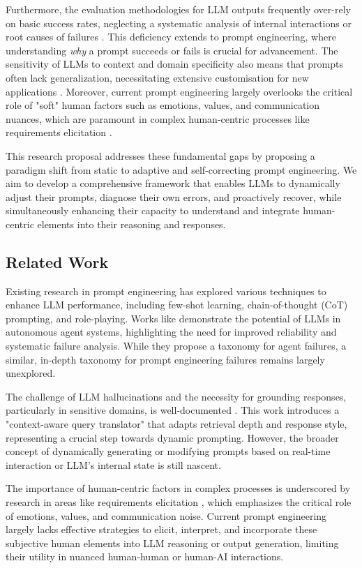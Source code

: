 \documentclass{article}
\begin{document}
Furthermore, the evaluation methodologies for LLM outputs frequently over-rely on basic success rates, neglecting a systematic analysis of internal interactions or root causes of failures \cite{paper1_agents}. This deficiency extends to prompt engineering, where understanding \textit{why} a prompt succeeds or fails is crucial for advancement. The sensitivity of LLMs to context and domain specificity also means that prompts often lack generalization, necessitating extensive customisation for new applications \cite{paper5_legalrag}. Moreover, current prompt engineering largely overlooks the critical role of "soft" human factors such as emotions, values, and communication nuances, which are paramount in complex human-centric processes like requirements elicitation \cite{paper2_requirements}.

This research proposal addresses these fundamental gaps by proposing a paradigm shift from static to adaptive and self-correcting prompt engineering. We aim to develop a comprehensive framework that enables LLMs to dynamically adjust their prompts, diagnose their own errors, and proactively recover, while simultaneously enhancing their capacity to understand and integrate human-centric elements into their reasoning and responses.  

\subsection{Related Work}
Existing research in prompt engineering has explored various techniques to enhance LLM performance, including few-shot learning, chain-of-thought (CoT) prompting, and role-playing. Works like \cite{paper1_agents} demonstrate the potential of LLMs in autonomous agent systems, highlighting the need for improved reliability and systematic failure analysis. While they propose a taxonomy for agent failures, a similar, in-depth taxonomy for prompt engineering failures remains largely unexplored.

The challenge of LLM hallucinations and the necessity for grounding responses, particularly in sensitive domains, is well-documented \cite{paper5_legalrag}. This work introduces a "context-aware query translator" that adapts retrieval depth and response style, representing a crucial step towards dynamic prompting. However, the broader concept of dynamically generating or modifying prompts based on real-time interaction or LLM's internal state is still nascent.

The importance of human-centric factors in complex processes is underscored by research in areas like requirements elicitation \cite{paper2_requirements}, which emphasizes the critical role of emotions, values, and communication noise. Current prompt engineering largely lacks effective strategies to elicit, interpret, and incorporate these subjective human elements into LLM reasoning or output generation, limiting their utility in nuanced human-human or human-AI interactions.
\end{document}
